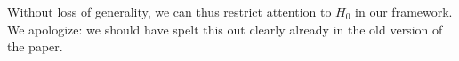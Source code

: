 \documentclass[a4paper,12pt]{article}
\begin{document}
\begin{enumerate}[label=\arabic*.,leftmargin=0.6cm]
\begin{enumerate}[leftmargin=0.7cm]
\begin{itemize}
\end{itemize}
Without loss of generality, we can thus restrict attention to $H_0$ in our framework. We apologize: we should have spelt this out clearly already in the old version of the paper. 



\end{enumerate}
\end{enumerate}
\end{document}
